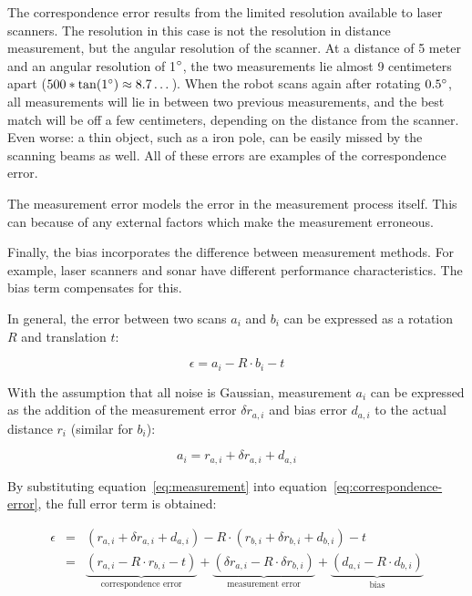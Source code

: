 The correspondence error results from the limited resolution available to laser scanners. The resolution in this case is not the resolution in distance measurement, but the angular resolution of the scanner. At a distance of 5 meter and an angular resolution of 1$\degree$, the two measurements lie almost 9 centimeters apart ($500 * \tan(1\degree) \approx 8.7\dots$). When the robot scans again after rotating $0.5\degree$, all measurements will lie in between two previous measurements, and the best match will be off a few centimeters, depending on the distance from the scanner. Even worse: a thin object, such as a iron pole, can be easily missed by the scanning beams as well. All of these errors are examples of the correspondence error.

The measurement error models the error in the measurement process itself. This can because of any external factors which make the measurement erroneous. 

Finally, the bias incorporates the difference between measurement methods. For example, laser scanners and sonar have different performance characteristics. The bias term compensates for this.

In general, the error between two scans $a_i$ and $b_i$ can be expressed as a rotation $R$ and translation $t$:

\begin{equation}
\label{eq:correspondence-error}
\epsilon = a_i - R \cdot b_i - t
\end{equation}

With the assumption that all noise is Gaussian, measurement $a_i$ can be expressed as the addition of the measurement error $\delta r_{a, i}$ and bias error $d_{a, i}$  to the actual distance $r_i$ (similar for $b_i$):

\begin{equation}
\label{eq:measurement}
a_i = r_{a,i} + \delta r_{a, i} + d_{a, i}
\end{equation}

By substituting equation~\ref{eq:measurement} into equation~\ref{eq:correspondence-error}, the full error term is obtained:

\begin{eqnarray}
\epsilon &=& (r_{a,i} + \delta r_{a, i} + d_{a, i}) - R \cdot (r_{b,i} + \delta r_{b, i} + d_{b, i}) - t
			 \nonumber \\
         &=& \underbrace{(r_{a, i} - R \cdot r_{b, i} - t)}_\text{correspondence error} + 
             \underbrace{(\delta r_{a, i} - R \cdot \delta r_{b, i})}_\text{measurement error} + 
             \underbrace{(d_{a, i} - R \cdot d_{b, i})}_\text{bias}
\end{eqnarray}




